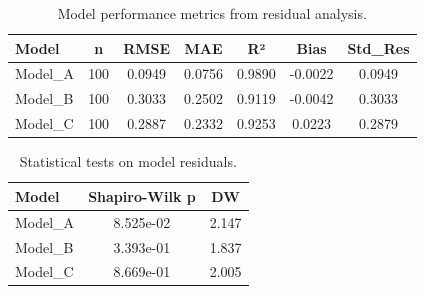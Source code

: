 
\begin{table}[htbp]
\centering
\caption{Model performance metrics from residual analysis.}
\label{tab:residual_analysis}
\begin{tabular}{lcccccc}
\toprule
Model & n & RMSE & MAE & R² & Bias & Std_Res \\
\midrule
Model_A & 100 & 0.0949 & 0.0756 & 0.9890 & -0.0022 & 0.0949 \\
Model_B & 100 & 0.3033 & 0.2502 & 0.9119 & -0.0042 & 0.3033 \\
Model_C & 100 & 0.2887 & 0.2332 & 0.9253 & 0.0223 & 0.2879 \\
\bottomrule
\end{tabular}
\end{table}

\begin{table}[htbp]
\centering
\caption{Statistical tests on model residuals.}
\label{tab:residual_tests}
\begin{tabular}{lcc}
\toprule
Model & Shapiro-Wilk p & DW \\
\midrule
Model_A & 8.525e-02 & 2.147 \\
Model_B & 3.393e-01 & 1.837 \\
Model_C & 8.669e-01 & 2.005 \\
\bottomrule
\end{tabular}
\end{table}
